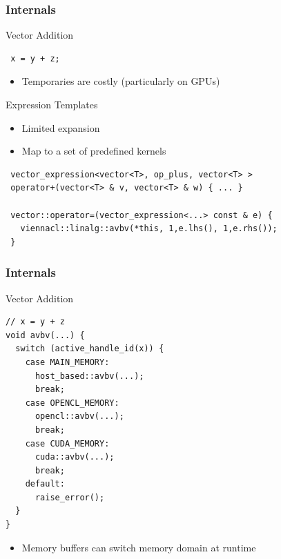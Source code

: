 

\begin{frame}[fragile]
\frametitle{Internals}

 \begin{block}{Vector Addition}
  \begin{lstlisting}
 x = y + z;
  \end{lstlisting}
  
  \begin{itemize}
   \item Temporaries are costly (particularly on GPUs)
  \end{itemize}

 \end{block}


 \begin{block}{Expression Templates}
  \begin{itemize}
   \item Limited expansion
   \item Map to a set of predefined kernels
  \end{itemize}
  
  \begin{lstlisting}
 vector_expression<vector<T>, op_plus, vector<T> >
 operator+(vector<T> & v, vector<T> & w) { ... }

 vector::operator=(vector_expression<...> const & e) {
   viennacl::linalg::avbv(*this, 1,e.lhs(), 1,e.rhs());
 }
  \end{lstlisting}
  \vspace*{0.5cm}

 \end{block}

\end{frame}



\begin{frame}[fragile]
\frametitle{Internals}

 \begin{block}{Vector Addition}
  \begin{lstlisting}
// x = y + z
void avbv(...) {
  switch (active_handle_id(x)) {
    case MAIN_MEMORY:
      host_based::avbv(...);
      break;
    case OPENCL_MEMORY:
      opencl::avbv(...);
      break;
    case CUDA_MEMORY:
      cuda::avbv(...);
      break;
    default: 
      raise_error();
  }
}
\end{lstlisting}
  \begin{itemize}
   \item Memory buffers can switch memory domain at runtime
  \end{itemize}

 \end{block}

\end{frame}


